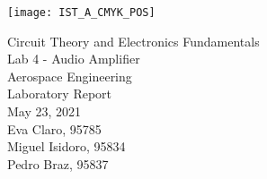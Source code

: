
\thispagestyle {empty}

\texttt{[image: IST\_A\_CMYK\_POS]}

\begin{center}
%
\vspace{1.0cm}

\vspace{2cm}
{\FontLb Circuit Theory and Electronics Fundamentals} \\ %
\vspace{1cm}
{\FontLb Lab 4 - Audio Amplifier} \\ %
\vspace{1cm}
{\FontLb Aerospace Engineering} \\ %
\vspace{4cm}
{\FontSn Laboratory Report} \\
\vspace{0.5cm}
{\FontSn May 23, 2021} \\ %
\vspace{7cm}
{\FontSn Eva Claro, 95785} \\
\vspace{0.5cm}
{\FontSn Miguel Isidoro, 95834} \\
\vspace{0.5cm}
{\FontSn Pedro Braz, 95837} \\
\newpage
%
\end{center}
